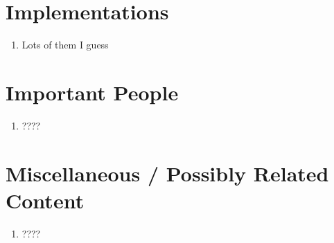\documentclass[thesis-solanki.tex]{subfiles}
\begin{document}
\section{Implementations}
\begin{enumerate}
\item Lots of them I guess
\end{enumerate}

\section{Important People}
\begin{enumerate}
\item ????
\end{enumerate}

\section{Miscellaneous / Possibly Related Content}
\begin{enumerate}
\item ????
\end{enumerate}
\end{document}
